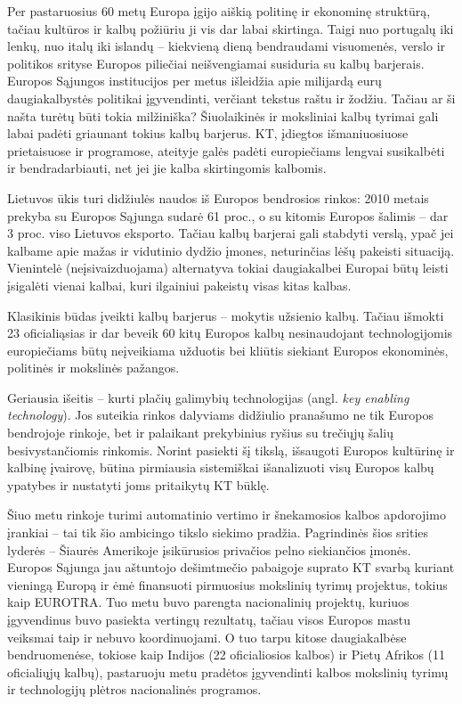 \documentclass[]{../metanetpaper}
\begin{document}
\begin{multicols}{2}
 Per pastaruosius 60 metų Europa įgijo aiškią politinę ir ekonominę struktūrą, tačiau kultūros ir kalbų požiūriu ji vis dar labai skirtinga. Taigi nuo portugalų iki lenkų, nuo italų iki islandų – kiekvieną dieną bendraudami visuomenės, verslo ir politikos srityse Europos piliečiai neišvengiamai susiduria su kalbų barjerais. Europos Sąjungos institucijos per metus išleidžia apie milijardą eurų daugiakalbystės politikai įgyvendinti, verčiant tekstus raštu ir žodžiu. Tačiau ar ši našta turėtų būti tokia milžiniška? Šiuolaikinės  ir moksliniai kalbų tyrimai gali labai padėti griaunant tokius kalbų barjerus. KT, įdiegtos išmaniuosiuose prietaisuose ir programose, ateityje galės padėti europiečiams lengvai susikalbėti ir bendradarbiauti, net jei jie kalba skirtingomis kalbomis. 


 Lietuvos ūkis turi didžiulės naudos iš Europos bendrosios rinkos: 2010 metais prekyba su Europos Sąjunga sudarė 61 proc., o su kitomis Europos šalimis – dar 3 proc. viso Lietuvos eksporto. Tačiau kalbų barjerai gali stabdyti verslą, ypač jei kalbame apie mažas ir vidutinio dydžio įmones, neturinčias lėšų pakeisti situaciją. Vienintelė (neįsivaizduojama) alternatyva tokiai daugiakalbei Europai būtų leisti įsigalėti vienai kalbai, kuri ilgainiui pakeistų visas kitas kalbas.

Klasikinis būdas įveikti kalbų barjerus – mokytis užsienio kalbų. Tačiau išmokti 23 oficialiąsias ir dar beveik 60 kitų Europos kalbų nesinaudojant technologijomis europiečiams būtų neįveikiama užduotis bei kliūtis siekiant Europos ekonominės, politinės ir mokslinės pažangos. 

Geriausia išeitis – kurti plačių galimybių technologijas (angl. \textit{key enabling technology}). Jos suteikia rinkos dalyviams didžiulio pranašumo ne tik Europos bendrojoje rinkoje, bet ir palaikant prekybinius ryšius su trečiųjų šalių besivystančiomis rinkomis. Norint pasiekti šį tikslą, išsaugoti Europos kultūrinę ir kalbinę įvairovę, būtina pirmiausia sistemiškai išanalizuoti visų Europos kalbų ypatybes ir nustatyti joms pritaikytų KT būklę.  

Šiuo metu rinkoje turimi automatinio vertimo ir šnekamosios kalbos apdorojimo įrankiai – tai tik šio ambicingo tikslo siekimo pradžia. Pagrindinės šios srities lyderės – Šiaurės Amerikoje įsikūrusios privačios pelno siekiančios įmonės. Europos Sąjunga jau aštuntojo dešimtmečio pabaigoje suprato KT svarbą kuriant vieningą Europą ir ėmė finansuoti pirmuosius mokslinių tyrimų projektus, tokius kaip EUROTRA. Tuo metu buvo parengta nacionalinių projektų, kuriuos įgyvendinus buvo pasiekta vertingų rezultatų, tačiau visos Europos mastu veiksmai taip ir nebuvo koordinuojami. O tuo tarpu kitose daugiakalbėse bendruomenėse, tokiose kaip Indijos (22 oficialiosios kalbos) ir Pietų Afrikos (11 oficialiųjų kalbų), pastaruoju metu pradėtos įgyvendinti kalbos mokslinių tyrimų ir technologijų plėtros nacionalinės programos.


\end{multicols}
\end{document}
